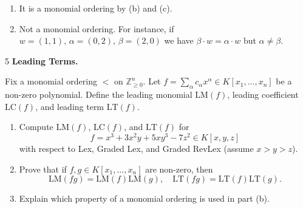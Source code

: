 \documentclass[Notebook.tex]{subfiles}
\begin{document}
\begin{solution}
\begin{enumerate}[label=(\alph*),ref=\theenumi\alph*]
        \item It is a monomial ordering by (b) and (c). 
        
        \item Not a monomial ordering. For instance, if $w = (1,1), \, \alpha = (0,2), \, \beta = (2,0)$ we have $\beta \cdot w = \alpha \cdot w$ but $\alpha \neq \beta$. 
    \end{enumerate}
\end{solution}

\newpage 

\begin{problem}{5} \textbf{Leading Terms.} 
    
    Fix a monomial ordering $<$ on $\mathbb{Z}_{\geq 0}^n$. Let $f = \sum_\alpha c_\alpha x^\alpha \in K[x_1, \dots, x_n]$ be a non-zero polynomial. Define the leading monomial $\mathrm{LM}(f)$, leading coefficient $\mathrm{LC}(f)$, and leading term $\mathrm{LT}(f)$.

    \begin{enumerate}[label=(\alph*),ref=\theenumi\alph*]
        \item Compute $\mathrm{LM}(f)$, $\mathrm{LC}(f)$, and $\mathrm{LT}(f)$ for
        \[
        f = x^3 + 3x^2 y + 5xy^3 - 7z^2 \in K[x,y,z]
        \]
        with respect to Lex, Graded Lex, and Graded RevLex (assume $x > y > z$).
        
        \item Prove that if $f, g \in K[x_1, \dots, x_n]$ are non-zero, then
        \[
        \mathrm{LM}(fg) = \mathrm{LM}(f)\mathrm{LM}(g), \quad \mathrm{LT}(fg) = \mathrm{LT}(f)\mathrm{LT}(g).
        \]
        
        \item Explain which property of a monomial ordering is used in part (b).
    \end{enumerate}
\end{problem}
\end{document}
